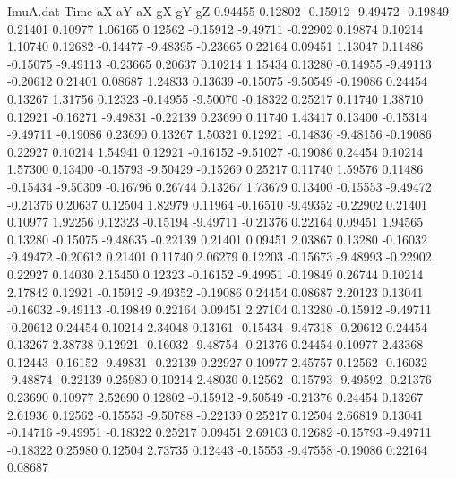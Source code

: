 \begin{filecontents}{ImuA.dat}
Time aX aY aX gX gY gZ
   0.94455    0.12802   -0.15912   -9.49472   -0.19849    0.21401    0.10977
   1.06165    0.12562   -0.15912   -9.49711   -0.22902    0.19874    0.10214
   1.10740    0.12682   -0.14477   -9.48395   -0.23665    0.22164    0.09451
   1.13047    0.11486   -0.15075   -9.49113   -0.23665    0.20637    0.10214
   1.15434    0.13280   -0.14955   -9.49113   -0.20612    0.21401    0.08687
   1.24833    0.13639   -0.15075   -9.50549   -0.19086    0.24454    0.13267
   1.31756    0.12323   -0.14955   -9.50070   -0.18322    0.25217    0.11740
   1.38710    0.12921   -0.16271   -9.49831   -0.22139    0.23690    0.11740
   1.43417    0.13400   -0.15314   -9.49711   -0.19086    0.23690    0.13267
   1.50321    0.12921   -0.14836   -9.48156   -0.19086    0.22927    0.10214
   1.54941    0.12921   -0.16152   -9.51027   -0.19086    0.24454    0.10214
   1.57300    0.13400   -0.15793   -9.50429   -0.15269    0.25217    0.11740
   1.59576    0.11486   -0.15434   -9.50309   -0.16796    0.26744    0.13267
   1.73679    0.13400   -0.15553   -9.49472   -0.21376    0.20637    0.12504
   1.82979    0.11964   -0.16510   -9.49352   -0.22902    0.21401    0.10977
   1.92256    0.12323   -0.15194   -9.49711   -0.21376    0.22164    0.09451
   1.94565    0.13280   -0.15075   -9.48635   -0.22139    0.21401    0.09451
   2.03867    0.13280   -0.16032   -9.49472   -0.20612    0.21401    0.11740
   2.06279    0.12203   -0.15673   -9.48993   -0.22902    0.22927    0.14030
   2.15450    0.12323   -0.16152   -9.49951   -0.19849    0.26744    0.10214
   2.17842    0.12921   -0.15912   -9.49352   -0.19086    0.24454    0.08687
   2.20123    0.13041   -0.16032   -9.49113   -0.19849    0.22164    0.09451
   2.27104    0.13280   -0.15912   -9.49711   -0.20612    0.24454    0.10214
   2.34048    0.13161   -0.15434   -9.47318   -0.20612    0.24454    0.13267
   2.38738    0.12921   -0.16032   -9.48754   -0.21376    0.24454    0.10977
   2.43368    0.12443   -0.16152   -9.49831   -0.22139    0.22927    0.10977
   2.45757    0.12562   -0.16032   -9.48874   -0.22139    0.25980    0.10214
   2.48030    0.12562   -0.15793   -9.49592   -0.21376    0.23690    0.10977
   2.52690    0.12802   -0.15912   -9.50549   -0.21376    0.24454    0.13267
   2.61936    0.12562   -0.15553   -9.50788   -0.22139    0.25217    0.12504
   2.66819    0.13041   -0.14716   -9.49951   -0.18322    0.25217    0.09451
   2.69103    0.12682   -0.15793   -9.49711   -0.18322    0.25980    0.12504
   2.73735    0.12443   -0.15553   -9.47558   -0.19086    0.22164    0.08687

\end{filecontents}
